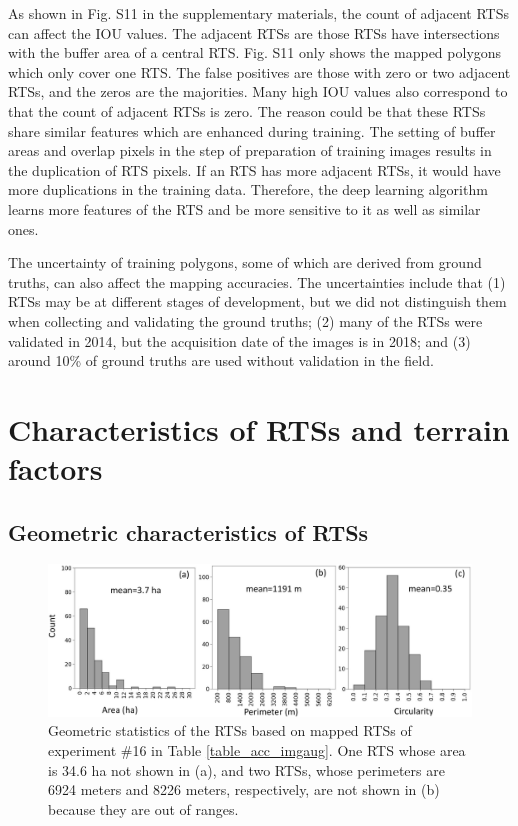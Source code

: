 \documentclass[preprint,12pt,authoryear]{elsarticle}
\begin{document}
As shown in Fig. S11 in the supplementary materials, the count of adjacent RTSs can affect the IOU values. The adjacent RTSs are those RTSs have intersections with the buffer area of a central RTS. Fig. S11 only shows the mapped polygons which only cover one RTS. The false positives are those with zero or two adjacent RTSs, and the zeros are the majorities. Many high IOU values also correspond to that the count of adjacent RTSs is zero. The reason could be that these RTSs share similar features which are enhanced during training. The setting of buffer areas and overlap pixels in the step of preparation of training images results in the duplication of RTS pixels. If an RTS has more adjacent RTSs, it would have more duplications in the training data. Therefore, the deep learning algorithm learns more features of the RTS and be more sensitive to it as well as similar ones. 

The uncertainty of training polygons, some of which are derived from ground truths, can also affect the mapping accuracies. The uncertainties include that (1) RTSs may be at different stages of development, but we did not distinguish them when collecting and validating the ground truths; (2) many of the RTSs were validated in 2014, but the acquisition date of the images is in 2018; and (3) around 10\% of ground truths are used without validation in the field. 


\section{Characteristics of RTSs and terrain factors}
\label{sec_spatial_terrain}


\subsection{Geometric characteristics of RTSs}
\label{subsec_geo_charac}

\begin{figure}
	\centering
	\includegraphics[width=14cm]{figures/geometric_var_mapped_trim.jpg}
	\caption{Geometric statistics of the RTSs based on mapped RTSs of experiment \#16 in Table \ref{table_acc_imgaug}. One RTS whose area is 34.6 ha not shown in (a), and two RTSs, whose perimeters are 6924 meters and 8226 meters, respectively, are not shown in (b) because they are out of ranges. }
	\label{fig_geometric_statistics}
\end{figure}
\end{document}
